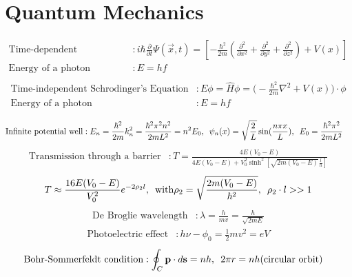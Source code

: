 \documentclass[12pt,a4paper]{article}
\begin{document}
	\section*{Quantum Mechanics}
	\begin{align*}
		\text{Time-dependent Schrodinger's Equation} & : i\hbar \frac{\partial}{\partial t} \Psi (\vec{x}, t) = [-\frac{\hbar^2}{2m}(\frac{\partial ^2}{\partial x^2} + \frac{\partial ^2}{\partial y ^2} + \frac{\partial^2}{\partial z^2}) + V(x)] \\
		\text{Energy of a photon} & : E = hf \\
	\end{align*}
		\begin{align*}
		\text{Time-independent Schrodinger's Equation} & : E\phi = \hat{H}\phi = \Big(-\frac{\hbar^2}{2m}\nabla^2 + V(x) \Big)\cdot \phi \\
		\text{Energy of a photon} & : E = hf \\
	\end{align*}
	\begin{align*}
		\text{Infinite potential well} & : E_n = \frac{\hbar^2}{2m}k_n^2 = \frac{\hbar^2 \pi^2 n^2}{2mL^2} = n^2 E_0, \hspace*{5pt} \psi_n (x) = \sqrt{\frac{2}{L}} \sin (\frac{n \pi x}{L}), \hspace*{5pt} E_0 = \frac{\hbar^2 \pi^2}{2mL^2}
	\end{align*}
	\begin{align*}
		\text{Transmission through a barrier} & : T = \frac{4E(V_0 - E)}{4E(V_0 - E) + V_0^2 \sinh^2 [\sqrt{2m(V_0 - E)}\frac{l}{h}]}
	\end{align*}
	\begin{align*}
	T \approx \frac{16E(V_0-E)}{V_0^2}e^{-2\rho_2 l}, \hspace*{5pt} \text{with} \rho_2 = \sqrt{\frac{2m(V_0-E)}{\hbar^2}}, \hspace*{5pt} \rho_2 \cdot l >> 1
	\end{align*}
	\begin{align*}
		\text{De Broglie wavelength} & : \lambda = \frac{h}{m v } = \frac{h}{\sqrt{2mE}}
	\end{align*}
		\begin{align*}
		\text{Photoelectric effect} & : h\nu - \phi_0 = \frac{1}{2} m v^2 = eV
	\end{align*}
	\begin{align*}
		\text{Bohr-Sommerfeldt condition} & : \oint_C \textbf{p} \cdot d\textbf{s} = nh, \hspace*{5pt} 2\pi r = nh \text{(circular orbit)}
	\end{align*}	
\end{document}
